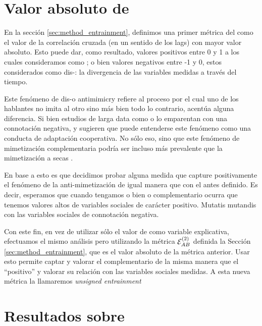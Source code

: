 

\section{Valor absoluto de \entrainment}
\label{sec:abs_entrainment}

En la sección \ref{sec:method_entrainment}, definimos una primer métrica del \entrainment como el valor de la correlación cruzada (en un sentido de los lags) con mayor valor absoluto. Esto puede dar, como resultado, valores positivos entre 0 y 1 a los cuales consideramos como \entrainment; o bien valores negativos entre -1 y 0, estos considerados como dis-\entrainment: la divergencia de las variables \ap medidas a través del tiempo.

Este fenómeno de dis-\entrainment o antimimicry \cite{CHAR1999} refiere al proceso por el cual uno de los hablantes no imita al otro sino más bien todo lo contrario, acentúa alguna diferencia. Si bien estudios de larga data como \cite{bourhis1973language} o \cite{dabbs1969similarity} lo emparentan con una connotación negativa, \cite{healey2014divergence} y \cite{levitan2015acoustic} sugieren que puede entenderse este fenómeno como una conducta de adaptación cooperativa. No sólo eso, sino que este fenómeno de mimetización complementaria podría ser incluso más prevalente que la mimetización a secas \cite{levitan2015acoustic}.

En base a esto es que decidimos probar alguna medida que capture positivamente el fenómeno de la anti-mimetización de igual manera que con el \entrainment antes definido. Es decir, esperamos que cuando tengamos o bien \entrainment o \entrainment complementario ocurra que tenemos valores altos de variables sociales de carácter positivo. Mutatis mutandis con las variables sociales de connotación negativa.

Con este fin, en vez de utilizar sólo el valor de \entrainment como variable explicativa, efectuamos el mismo análisis pero utilizando la métrica $\mathcal{E}_{AB}^{(2)}$ definida la Sección \ref{sec:method_entrainment}, que es el valor absoluto de la métrica anterior. Usar esto permite captar y valorar el \entrainment complementario de la misma manera que el ``positivo'' y valorar su relación con las variables sociales medidas. A esta nueva métrica la llamaremos \emph{unsigned entrainment}

\section{Resultados sobre \absentrainment}

